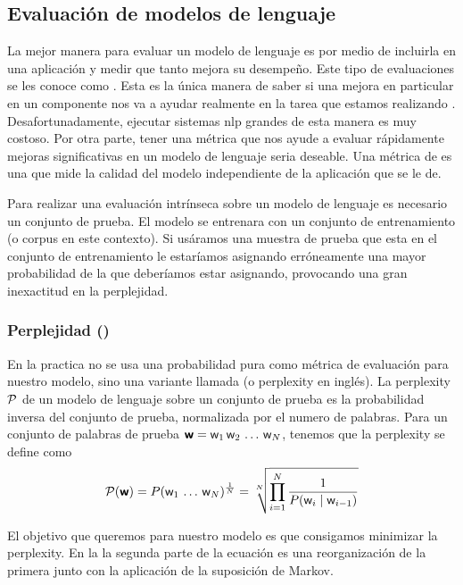 \subsection{Evaluación de modelos de lenguaje}
La mejor manera para evaluar un modelo de lenguaje es por medio de incluirla en una aplicación y medir que tanto mejora su desempeño. Este tipo de evaluaciones se les conoce como . Esta es la única manera de saber si una mejora en particular en un componente nos va a ayudar realmente en la tarea que estamos realizando \cite{jurafsky-martin}. Desafortunadamente, ejecutar sistemas \gls{nlp} grandes de esta manera es muy costoso. Por otra parte, tener una métrica que nos ayude a evaluar rápidamente mejoras significativas en un modelo de lenguaje seria deseable. Una métrica de  es una que mide la calidad del modelo independiente de la aplicación que se le de.

Para realizar una evaluación intrínseca sobre un modelo de lenguaje es necesario un conjunto de prueba. El modelo se entrenara con un conjunto de entrenamiento (o \gls{corpus} en este contexto). Si usáramos una muestra de prueba que esta en el conjunto de entrenamiento le estaríamos asignando erróneamente una mayor probabilidad de la que deberíamos estar asignando, provocando una gran inexactitud en la perplejidad.

\subsubsection{Perplejidad ()}
En la practica no se usa una probabilidad pura como métrica de evaluación para nuestro modelo, sino una variante llamada  (o \gls{perplexity} en inglés). La \gls{perplexity} $\mathcal{P}$ de un modelo de lenguaje sobre un conjunto de prueba es la probabilidad inversa del conjunto de prueba, normalizada por el numero de palabras. Para un conjunto de palabras de prueba ${\bm{\mathit{\mathsf{w}}}} = {\mathit{\mathsf{w}}}_1 \, {\mathit{\mathsf{w}}}_2 \, \ldots \, {\mathit{\mathsf{w}}}_N$, tenemos que la \gls{perplexity} se define como
\begin{equation} \label{eq:perplexity-def}
  \mathcal{P}({\bm{\mathit{\mathsf{w}}}}) = P({\mathit{\mathsf{w}}}_1 \, \ldots \, {\mathit{\mathsf{w}}}_N)^{\frac{1}{N}} = \sqrt[N]{\prod_{i=1}^{N} \frac{1}{P({\mathit{\mathsf{w}}}_i \mid {\mathit{\mathsf{w}}}_{i-1})}}
\end{equation}

El objetivo que queremos para nuestro modelo es que consigamos minimizar la \gls{perplexity}. En la  la segunda parte de la ecuación es una reorganización de la primera junto con la aplicación de la suposición de Markov.

